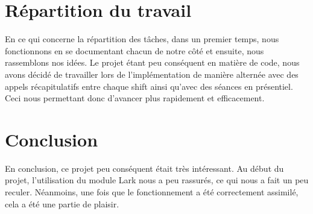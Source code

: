 \section{Répartition du travail}
En ce qui concerne la répartition des tâches, dans un premier temps, nous fonctionnons en se documentant chacun de notre côté et ensuite, nous rassemblons nos idées.
Le projet étant peu conséquent en matière de code, nous avons décidé de travailler lors de l'implémentation de manière alternée avec des appels récapitulatifs entre chaque shift ainsi qu'avec des séances en présentiel.
Ceci nous permettant donc d'avancer plus rapidement et efficacement.

\section{Conclusion}
En conclusion, ce projet peu conséquent était très intéressant.
Au début du projet, l'utilisation du module Lark nous a peu rassurés, ce qui nous a fait un peu reculer. 
Néanmoins, une fois que le fonctionnement a été correctement assimilé, cela a été une partie de plaisir.
